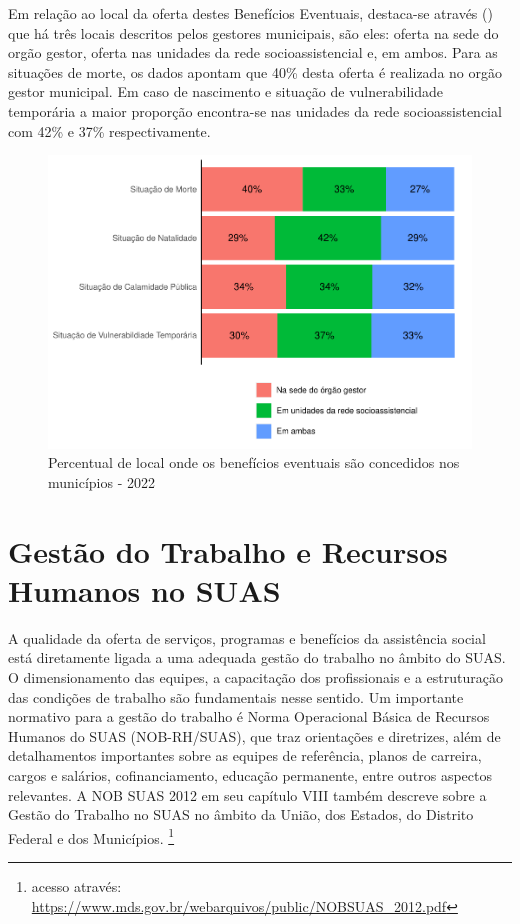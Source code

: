 \documentclass[
  brazilian]{report}
\begin{document}
Em relação ao local da oferta destes Benefícios Eventuais, destaca-se
através () que há três locais descritos pelos
gestores municipais, são eles: oferta na sede do orgão gestor, oferta
nas unidades da rede socioassistencial e, em ambos. Para as situações de
morte, os dados apontam que 40\% desta oferta é realizada no orgão
gestor municipal. Em caso de nascimento e situação de vulnerabilidade
temporária a maior proporção encontra-se nas unidades da rede
socioassistencial com 42\% e 37\% respectivamente.

\begin{figure}
\includegraphics{Censo-SUAS-2022_files/figure-latex/be-local-1} \caption[Percentual de local onde os benefícios eventuais são concedidos nos municípios - 2022]{Percentual de local onde os benefícios eventuais são concedidos nos municípios - 2022}\label{fig:be-local}
\end{figure}

\hypertarget{gestuxe3o-do-trabalho-e-recursos-humanos-no-suas}{%
\chapter{Gestão do Trabalho e Recursos Humanos no
SUAS}\label{gestuxe3o-do-trabalho-e-recursos-humanos-no-suas}}

A qualidade da oferta de serviços, programas e benefícios da assistência
social está diretamente ligada a uma adequada gestão do trabalho no
âmbito do SUAS. O dimensionamento das equipes, a capacitação dos
profissionais e a estruturação das condições de trabalho são
fundamentais nesse sentido. Um importante normativo para a gestão do
trabalho é Norma Operacional Básica de Recursos Humanos do SUAS
(NOB-RH/SUAS), que traz orientações e diretrizes, além de detalhamentos
importantes sobre as equipes de referência, planos de carreira, cargos e
salários, cofinanciamento, educação permanente, entre outros aspectos
relevantes. A NOB SUAS 2012 em seu capítulo VIII também descreve sobre a
Gestão do Trabalho no SUAS no âmbito da União, dos Estados, do Distrito
Federal e dos Municípios.
\footnote{acesso através:\url{ https://www.mds.gov.br/webarquivos/public/NOBSUAS_2012.pdf}}
\end{document}
